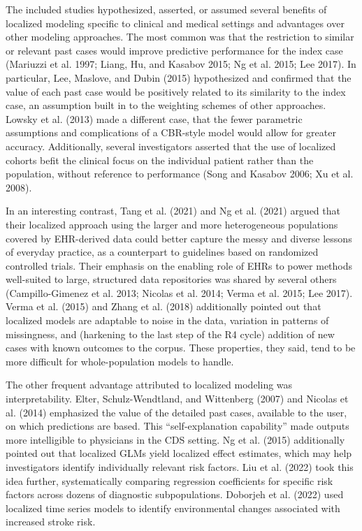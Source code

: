 \documentclass{article}
\begin{document}
The included studies hypothesized, asserted, or assumed several benefits
of localized modeling specific to clinical and medical settings and
advantages over other modeling approaches. The most common was that the
restriction to similar or relevant past cases would improve predictive
performance for the index case (Mariuzzi et al. 1997; Liang, Hu, and
Kasabov 2015; Ng et al. 2015; Lee 2017). In particular, Lee, Maslove,
and Dubin (2015) hypothesized and confirmed that the value of each past
case would be positively related to its similarity to the index case, an
assumption built in to the weighting schemes of other approaches. Lowsky
et al. (2013) made a different case, that the fewer parametric
assumptions and complications of a CBR-style model would allow for
greater accuracy. Additionally, several investigators asserted that the
use of localized cohorts befit the clinical focus on the individual
patient rather than the population, without reference to performance
(Song and Kasabov 2006; Xu et al. 2008).

In an interesting contrast, Tang et al. (2021) and Ng et al. (2021)
argued that their localized approach using the larger and more
heterogeneous populations covered by EHR-derived data could better
capture the messy and diverse lessons of everyday practice, as a
counterpart to guidelines based on randomized controlled trials. Their
emphasis on the enabling role of EHRs to power methods well-suited to
large, structured data repositories was shared by several others
(Campillo-Gimenez et al. 2013; Nicolas et al. 2014; Verma et al. 2015;
Lee 2017). Verma et al. (2015) and Zhang et al. (2018) additionally
pointed out that localized models are adaptable to noise in the data,
variation in patterns of missingness, and (harkening to the last step of
the R4 cycle) addition of new cases with known outcomes to the corpus.
These properties, they said, tend to be more difficult for
whole-population models to handle.

The other frequent advantage attributed to localized modeling was
interpretability. Elter, Schulz-Wendtland, and Wittenberg (2007) and
Nicolas et al. (2014) emphasized the value of the detailed past cases,
available to the user, on which predictions are based. This
``self-explanation capability'' made outputs more intelligible to
physicians in the CDS setting. Ng et al. (2015) additionally pointed out
that localized GLMs yield localized effect estimates, which may help
investigators identify individually relevant risk factors. Liu et al.
(2022) took this idea further, systematically comparing regression
coefficients for specific risk factors across dozens of diagnostic
subpopulations. Doborjeh et al. (2022) used localized time series models
to identify environmental changes associated with increased stroke risk.
\end{document}
